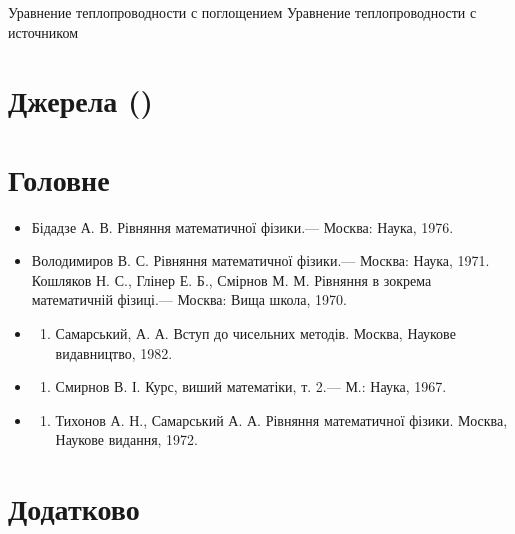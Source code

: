 \documentclass[
  ukrainian,
]{article}
\providecommand{\tightlist}{%
  \setlength{\itemsep}{0pt}\setlength{\parskip}{0pt}}
\begin{document}
Уравнение теплопроводности с поглощением Уравнение теплопроводности с
источником

\section{Джерела ()}\label{ux434ux436ux435ux440ux435ux43bux430}

\section{Головне}\label{ux433ux43eux43bux43eux432ux43dux435}

\begin{itemize}
\tightlist
\item
  Бідадзе А. В. Рівняння математичної фізики.--- Москва: Наука, 1976.
\item
  Володимиров В. С. Рівняння математичної фізики.--- Москва: Наука,
  1971. Кошляков Н. С., Глінер Е. Б., Смірнов М. М. Рівняння в зокрема
  математичній фізиці.--- Москва: Вища школа, 1970.
\item
  \begin{enumerate}
  \def\labelenumi{\arabic{enumi}.}
  \setcounter{enumi}{3}
  \tightlist
  \item
    Самарський, А. А. Вступ до чисельних методів. Москва, Наукове
    видавництво, 1982.
  \end{enumerate}
\item
  \begin{enumerate}
  \def\labelenumi{\arabic{enumi}.}
  \setcounter{enumi}{4}
  \tightlist
  \item
    Смирнов В. І. Курс, виший математіки, т. 2.--- М.: Наука, 1967.
  \end{enumerate}
\item
  \begin{enumerate}
  \def\labelenumi{\arabic{enumi}.}
  \setcounter{enumi}{5}
  \tightlist
  \item
    Тихонов А. Н., Самарський А. А. Рівняння математичної фізики.
    Москва, Наукове видання, 1972.
  \end{enumerate}
\end{itemize}

\section{Додатково}\label{ux434ux43eux434ux430ux442ux43aux43eux432ux43e}
\end{document}
